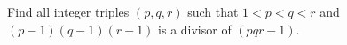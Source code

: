 Find all integer triples $(p, q, r)$ such that $1 < p < q < r$ and $(p-1)(q-1)(r-1)$ is a divisor of $(pqr - 1)$.
